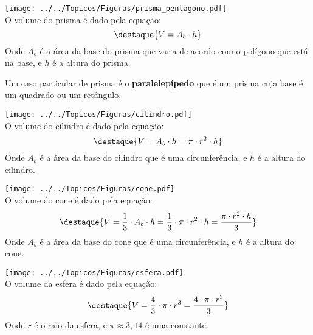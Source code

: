 \begin{multicols}{2}
 \texttt{[image: ../../Topicos/Figuras/prisma\_pentagono.pdf]} \\
 O volume do prisma é dado pela equação:
 \[\destaque{V= A_b \cdot h }\]
 Onde $A_b$ é a área da base do prisma que varia de acordo com o polígono que está na base, e $h$ é a altura do prisma.
 
 Um caso particular de prisma é o \textbf{paralelepípedo} que é um prisma cuja base é um quadrado ou um retângulo. 
\end{multicols}

\begin{multicols}{2}
 \texttt{[image: ../../Topicos/Figuras/cilindro.pdf]} \\
 O volume do cilindro é dado pela equação:
 \[\destaque{V= A_b \cdot h= \pi \cdot r^2 \cdot h }\]
 Onde $A_b$ é a área da base do cilindro que é uma circunferência, e $h$ é a altura do cilindro.
\end{multicols}

\begin{multicols}{2}
 \texttt{[image: ../../Topicos/Figuras/cone.pdf]} \\
 
 O volume do cone é dado pela equação:
 \[\destaque{V= \frac{1}{3} \cdot A_b \cdot h= \frac{1}{3} \cdot \pi \cdot r^2 \cdot h = \frac{\pi \cdot r^2 \cdot h}{3}}\]
 Onde $A_b$ é a área da base do cone que é uma circunferência, e $h$ é a altura do cone.
\end{multicols}

\begin{multicols}{2}
 \texttt{[image: ../../Topicos/Figuras/esfera.pdf]} \\
 
 O volume da esfera é dado pela equação:
 \[\destaque{V= \frac{4}{3} \cdot \pi \cdot r^3= \frac{4 \cdot \pi \cdot r^3}{3}}\]
 Onde $r$ é o raio da esfera, e $\pi \approx 3,14$ é uma constante.
\end{multicols}

\newpage


